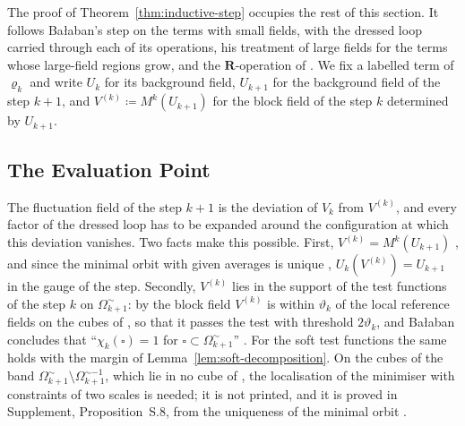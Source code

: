 \documentclass[11pt]{preprint}
\numberwithin{equation}{section}
\theoremstyle{definition}
\theoremstyle{remark}
\theoremstyle{plain}
\begin{document}
The proof of Theorem~\ref{thm:inductive-step} occupies the rest of this section. It follows Ba{\l}aban's step \cite[Sect.~3]{BalabanCRE} on the terms with small fields, with the dressed loop carried through each of its operations, his treatment of large fields \cite[Sect.~1]{BalabanLFR2} for the terms whose large-field regions grow, and the $\mathbf R$-operation of \cite{BalabanLFR1,BalabanLFR2}. We fix a labelled term of $\varrho_k$ and write $U_k$ for its background field, $U_{k+1}$ for the background field of the step $k + 1$, and $V^{(k)} \coloneqq M^k(U_{k+1})$ for the block field of the step $k$ determined by $U_{k+1}$.

\subsection{The Evaluation Point}\label{sec:evaluation-point}

The fluctuation field of the step $k + 1$ is the deviation of $V_k$ from $V^{(k)}$, and every factor of the dressed loop has to be expanded around the configuration at which this deviation vanishes. Two facts make this possible. First, $V^{(k)} = M^k(U_{k+1})$ \cite[(2.3), p.~265]{BalabanRG1}, and since the minimal orbit with given averages is unique \cite[p.~256]{BalabanCRE}, $U_k(V^{(k)}) = U_{k+1}$ in the gauge of the step. Secondly, $V^{(k)}$ lies in the support of the test functions of the step $k$ on $\Omega_{k+1}^{\sim}$: by \cite[(3.19), p.~268]{BalabanCRE} the block field $V^{(k)}$ is within $\vartheta_k$ of the local reference fields on the cubes of \cite[(3.16)]{BalabanCRE}, so that it passes the test \cite[(3.3), p.~265]{BalabanCRE} with threshold $2\vartheta_k$, and Ba{\l}aban concludes that ``$\chi_k(\square) = 1$ for $\square \subset \Omega_{k+1}^{\sim}$'' \cite[p.~266]{BalabanCRE}. For the soft test functions the same holds with the margin of Lemma~\ref{lem:soft-decomposition}. On the cubes of the band $\Omega^{\sim}_{k+1} \setminus \Omega^{\sim-1}_{k+1}$, which lie in no cube of \cite[(3.16)]{BalabanCRE}, the localisation of the minimiser with constraints of two scales is needed; it is not printed, and it is proved in Supplement, Proposition~S.8, from the uniqueness of the minimal orbit \cite[Theorem~1]{BalabanVAR}.
\end{document}
